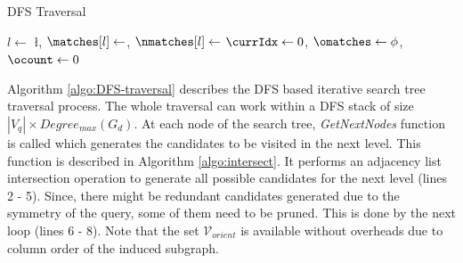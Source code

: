 \begin{algorithm}
    \caption{DFS Traversal}
    \label{algo:DFS-traversal}
    \small



    $l \leftarrow $ \l, $\matches[l] \leftarrow $\imatches, $\nmatches[l] \leftarrow $\isize\;
    $ \currIdx \leftarrow 0$, $\omatches \leftarrow \phi $, $\ocount \leftarrow 0$  \;
\end{algorithm}

Algorithm \ref{algo:DFS-traversal} describes the DFS based iterative search tree traversal process.
The whole traversal can work within a DFS stack of size $|V_q|\times Degree_{max}(G_d)$.
At each node of the search tree, \textit{GetNextNodes} function is called which generates the candidates to be visited in the next level.
This function is described in Algorithm \ref{algo:intersect}.
It performs an adjacency list intersection operation to generate all possible candidates for the next level (lines 2 - 5).
Since, there might be redundant candidates generated due to the symmetry of the query, some of them need to be pruned. This is done by the next loop (lines 6 - 8).
Note that the set $\mathcal{V}_{orient}$ is available without overheads due to column order of the induced subgraph.

